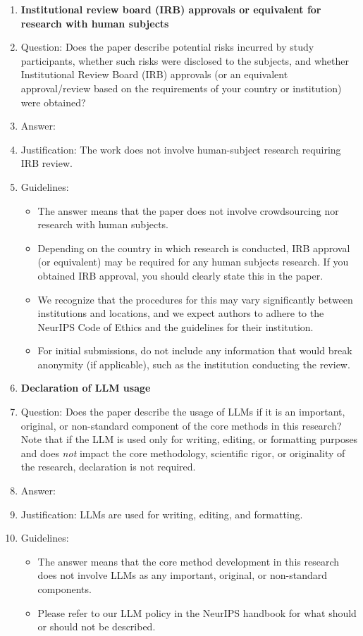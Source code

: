 \documentclass{article}
\begin{document}
\begin{enumerate}
\item {\bf Institutional review board (IRB) approvals or equivalent for research with human subjects}
    \item[] Question: Does the paper describe potential risks incurred by study participants, whether such risks were disclosed to the subjects, and whether Institutional Review Board (IRB) approvals (or an equivalent approval/review based on the requirements of your country or institution) were obtained?
    \item[] Answer: \answerNA{} %
    \item[] Justification: The work does not involve human-subject research requiring IRB review.
    \item[] Guidelines:
    \begin{itemize}
        \item The answer \answerNA{} means that the paper does not involve crowdsourcing nor research with human subjects.
        \item Depending on the country in which research is conducted, IRB approval (or equivalent) may be required for any human subjects research. If you obtained IRB approval, you should clearly state this in the paper. 
        \item We recognize that the procedures for this may vary significantly between institutions and locations, and we expect authors to adhere to the NeurIPS Code of Ethics and the guidelines for their institution. 
        \item For initial submissions, do not include any information that would break anonymity (if applicable), such as the institution conducting the review.
    \end{itemize}

\item {\bf Declaration of LLM usage}
    \item[] Question: Does the paper describe the usage of LLMs if it is an important, original, or non-standard component of the core methods in this research? Note that if the LLM is used only for writing, editing, or formatting purposes and does \emph{not} impact the core methodology, scientific rigor, or originality of the research, declaration is not required.
    \item[] Answer: \answerNA{} %
    \item[] Justification: LLMs are used for writing, editing, and formatting.
    \item[] Guidelines:
    \begin{itemize}
        \item The answer \answerNA{} means that the core method development in this research does not involve LLMs as any important, original, or non-standard components.
        \item Please refer to our LLM policy in the NeurIPS handbook for what should or should not be described.
    \end{itemize}

\end{enumerate}
\end{document}
